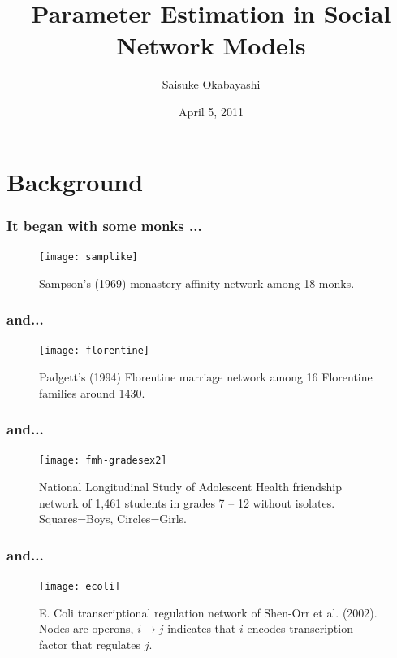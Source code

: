 \documentclass[slidestop,compress, 10pt]{beamer}
\title{Parameter Estimation in Social Network Models}
\author{
  Saisuke Okabayashi 
}
\institute{Department of Statistics \\ University of Minnesota}
\date{April 5, 2011}
\begin{document}

\frame{\titlepage}
\section{Background}


\frame
{
  \frametitle{It began with some monks ...}
\begin{figure}
\begin{center} 
\texttt{[image: samplike]}
\caption{Sampson's (1969) monastery affinity network among 18 monks.} 
\end{center} 
\end{figure}
}
\frame
{
  \frametitle{and... }

\begin{figure}
\begin{center} 
\texttt{[image: florentine]}
\caption{Padgett's (1994) Florentine marriage network among 16 Florentine families around 1430.} 
\end{center} 
\end{figure}
}
\frame
{
  \frametitle{and... }
\begin{figure}
\begin{center} 
\texttt{[image: fmh-gradesex2]}
\caption{National Longitudinal Study of Adolescent Health friendship network of 1,461 students in grades 7 -- 12 without isolates.  Squares=Boys, Circles=Girls.} 
\end{center} 
\label{fmh} 
\end{figure}
}
\frame
{
  \frametitle{and...}

\begin{figure}
\begin{center} 
\texttt{[image: ecoli]}
\caption{E. Coli transcriptional regulation network of Shen-Orr et al. (2002).  
Nodes are operons, $i \to j$ indicates that $i$ encodes transcription factor that regulates $j$.} 
\end{center} 
\end{figure}
}
\end{document}
